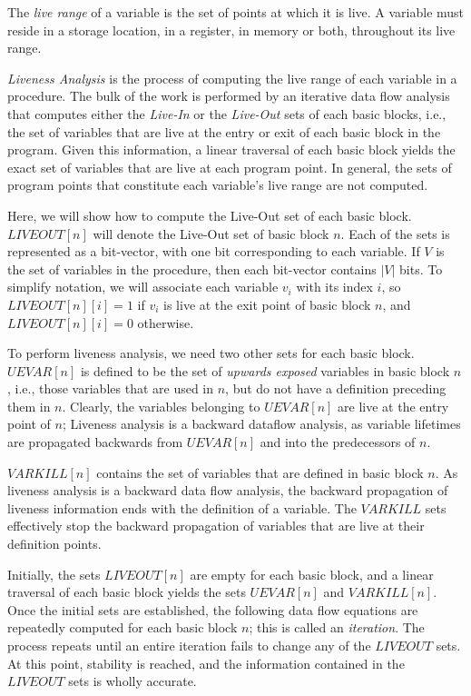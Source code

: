 The \emph{live range} of a variable is the set of points
at which it is live. A variable must reside in a storage 
location, in a register, in memory or both, throughout
its live range.  

\emph{Liveness Analysis} is the process of computing the
live range of each variable in a procedure. The bulk of
the work is performed by an iterative data flow analysis
that computes either the \emph{Live-In} or the 
\emph{Live-Out} sets of each basic blocks, i.e., the set
of variables that are live at the entry or exit of
each basic block in the program. Given this information,
a linear traversal of each basic block yields the 
exact set of variables that are live at each program
point. In general, the sets of program points that
constitute each variable's live range are not computed.

Here, we will show how to compute the Live-Out set of
each basic block. $LIVEOUT[n]$ will denote the Live-Out
set of basic block $n$. Each of the sets is represented
as a bit-vector, with one bit corresponding to each
variable. If $V$ is the set of variables in the procedure,
then each bit-vector contains $|V|$ bits. To simplify
notation, we will associate each variable $v_{i}$ with
its index $i$, so $LIVEOUT[n][i] = 1$ if $v_{i}$ is live
at the exit point of basic block $n$, and 
$LIVEOUT[n][i] = 0$ otherwise. 

To perform liveness analysis, we need two other sets for
each basic block. $UEVAR[n]$ is defined to be the set of
\emph{upwards exposed} variables in basic block $n$, i.e.,
those variables that are used in $n$, but do not have a 
definition preceding them in $n$. Clearly, the variables
belonging to $UEVAR[n]$ are live at the entry point of $n$;
Liveness analysis is a backward dataflow analysis, as
variable lifetimes are propagated backwards from
$UEVAR[n]$ and into the predecessors of $n$. 

$VARKILL[n]$ contains the set of variables that are defined
in basic block $n$. As liveness analysis is a backward
data flow analysis, the backward propagation of liveness
information ends with the definition of a variable. 
The $VARKILL$ sets effectively stop the backward 
propagation of variables that are live at their definition
points.

Initially, the sets $LIVEOUT[n]$ are empty for each basic 
block, and a linear traversal of each basic block yields
the sets $UEVAR[n]$ and $VARKILL[n]$. Once the initial sets
are established, the following data flow equations are
repeatedly computed for each basic block $n$; this is 
called an \emph{iteration}. The process repeats until an 
entire iteration fails to change any of the $LIVEOUT$ sets.
At this point, stability is reached, and the information
contained in the $LIVEOUT$ sets is wholly accurate.

